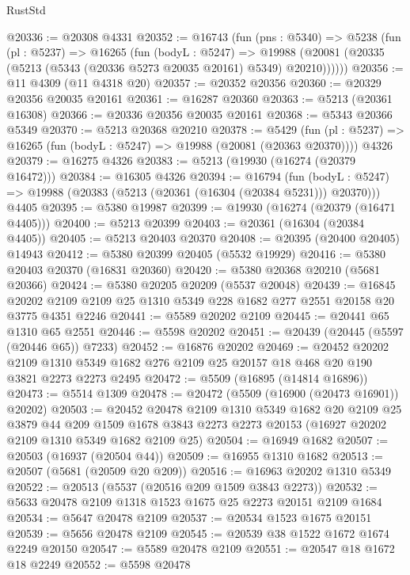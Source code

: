 \begin{lexlean}{RustStd}
\begin{coremodule}
@20336 := @20308 @4331
@20352 := @16743
    (fun (pns : @5340) =>
    @5238
      (fun (pl : @5237) =>
      @16265
        (fun (bodyL : @5247) =>
        @19988 (@20081 (@20335 (@5213 (@5343 (@20336 @5273 @20035 @20161) @5349) @20210))))))
@20356 := @11 @4309 (@11 @4318 @20)
@20357 := @20352 @20356
@20360 := @20329 @20356 @20035 @20161
@20361 := @16287 @20360
@20363 := @5213 (@20361 @16308)
@20366 := @20336 @20356 @20035 @20161
@20368 := @5343 @20366 @5349
@20370 := @5213 @20368 @20210
@20378 := @5429
    (fun (pl : @5237) => @16265 (fun (bodyL : @5247) => @19988 (@20081 (@20363 @20370))))
    @4326
@20379 := @16275 @4326
@20383 := @5213 (@19930 (@16274 (@20379 @16472)))
@20384 := @16305 @4326
@20394 := @16794
    (fun (bodyL : @5247) => @19988 (@20383 (@5213 (@20361 (@16304 (@20384 @5231))) @20370)))
    @4405
@20395 := @5380 @19987
@20399 := @19930 (@16274 (@20379 (@16471 @4405)))
@20400 := @5213 @20399
@20403 := @20361 (@16304 (@20384 @4405))
@20405 := @5213 @20403 @20370
@20408 := @20395 (@20400 @20405) @14943
@20412 := @5380 @20399 @20405 (@5532 @19929)
@20416 := @5380 @20403 @20370 (@16831 @20360)
@20420 := @5380 @20368 @20210 (@5681 @20366)
@20424 := @5380 @20205 @20209 (@5537 @20048)
@20439 := @16845
    @20202
    @2109
    @2109
    @25
    @1310
    @5349
    @228
    @1682
    @277
    @2551
    @20158
    @20
    @3775
    @4351
    @2246
@20441 := @5589 @20202 @2109
@20445 := @20441 @65 @1310 @65 @2551
@20446 := @5598 @20202
@20451 := @20439 (@20445 (@5597 (@20446 @65)) @7233)
@20452 := @16876 @20202
@20469 := @20452
    @20202
    @2109
    @1310
    @5349
    @1682
    @276
    @2109
    @25
    @20157
    @18
    @468
    @20
    @190
    @3821
    @2273
    @2273
    @2495
@20472 := @5509 (@16895 (@14814 @16896))
@20473 := @5514 @1309
@20478 := @20472 (@5509 (@16900 (@20473 @16901)) @20202)
@20503 := @20452
    @20478
    @2109
    @1310
    @5349
    @1682
    @20
    @2109
    @25
    @3879
    @44
    @209
    @1509
    @1678
    @3843
    @2273
    @2273
    @20153
    (@16927 @20202 @2109 @1310 @5349 @1682 @2109 @25)
@20504 := @16949 @1682
@20507 := @20503 (@16937 (@20504 @44))
@20509 := @16955 @1310 @1682
@20513 := @20507 (@5681 (@20509 @20 @209))
@20516 := @16963 @20202 @1310 @5349
@20522 := @20513 (@5537 (@20516 @209 @1509 @3843 @2273))
@20532 := @5633 @20478 @2109 @1318 @1523 @1675 @25 @2273 @20151 @2109 @1684
@20534 := @5647 @20478 @2109
@20537 := @20534 @1523 @1675 @20151
@20539 := @5656 @20478 @2109
@20545 := @20539 @38 @1522 @1672 @1674 @2249 @20150
@20547 := @5589 @20478 @2109
@20551 := @20547 @18 @1672 @18 @2249
@20552 := @5598 @20478

\end{coremodule}
\end{lexlean}
